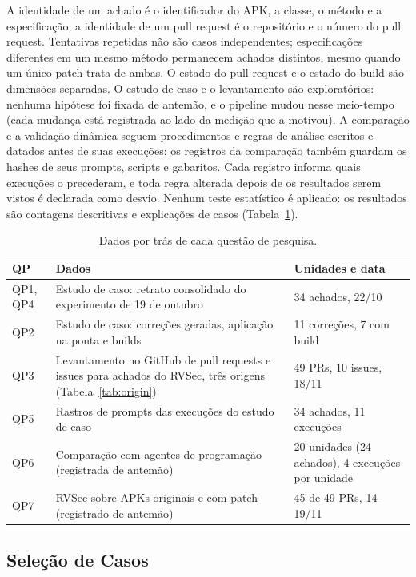 \documentclass[conference]{IEEEtran}
\begin{document}
A identidade de um achado é o identificador do APK, a classe, o método e a especificação; a
identidade de um pull request é o repositório e o número do pull request. Tentativas repetidas não são casos
independentes; especificações diferentes em um mesmo método permanecem achados distintos, mesmo
quando um único patch trata de ambas. O estado do pull request e o estado do build são dimensões
separadas. O estudo de caso e o levantamento são exploratórios: nenhuma hipótese foi
fixada de antemão, e o pipeline mudou nesse meio-tempo (cada mudança está registrada
ao lado da medição que a motivou). A comparação e a validação
dinâmica seguem procedimentos e regras de análise escritos e datados
antes de suas execuções; os registros da comparação também guardam os hashes de
seus prompts, scripts e gabaritos. Cada registro informa quais execuções
o precederam, e toda regra alterada depois de os resultados serem vistos é declarada como
desvio. Nenhum teste estatístico é aplicado: os resultados são contagens descritivas e
explicações de casos (Tabela~\ref{tab:rq-data}).

\begin{table}[H]
\centering
\caption{Dados por trás de cada questão de pesquisa.}
\label{tab:rq-data}
\footnotesize
\begin{tabular}{p{0.9cm}p{3.7cm}p{2.6cm}}
\toprule
QP & Dados & Unidades e data \\
\midrule
QP1, QP4 & Estudo de caso: retrato consolidado do experimento de 19 de outubro & 34 achados, 22/10 \\
QP2 & Estudo de caso: correções geradas, aplicação na ponta e builds & 11 correções, 7 com build \\
QP3 & Levantamento no GitHub de pull requests e issues para achados do RVSec, três origens (Tabela~\ref{tab:origin}) & 49 PRs, 10 issues, 18/11 \\
QP5 & Rastros de prompts das execuções do estudo de caso & 34 achados, 11 execuções \\
QP6 & Comparação com agentes de programação (registrada de antemão) & 20 unidades (24 achados), 4 execuções por unidade \\
QP7 & RVSec sobre APKs originais e com patch (registrado de antemão) & 45 de 49 PRs, 14--19/11 \\
\bottomrule
\end{tabular}
\end{table}

\subsection{Seleção de Casos}
\label{subsec:selection}
\end{document}
